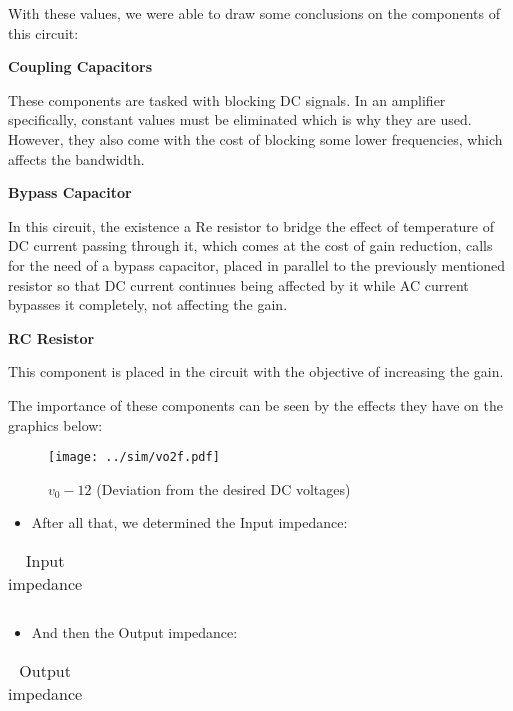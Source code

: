 \par With these values, we were able to draw some conclusions on the components of this circuit:
\par \textbf{Coupling Capacitors}
\par These components are tasked with blocking DC signals. In an amplifier specifically, constant values must be eliminated which is why they are used. However, they also come with the cost of blocking some lower frequencies, which affects the bandwidth.
\par \textbf{Bypass Capacitor}
\par In this circuit, the existence a Re resistor to bridge the effect of temperature of DC current passing through it, which comes at the cost of gain reduction, calls for the need of a bypass capacitor, placed in parallel to the previously mentioned resistor so that DC current continues being affected by it while AC current bypasses it completely, not affecting the gain.
\par \textbf{RC Resistor}
\par This component is placed in the circuit with the objective of increasing the gain. 
\par The importance of these components can be seen by the effects they have on the graphics below:

\begin{figure}[H]
    \texttt{[image: ../sim/vo2f.pdf]}
    \centering
    \caption{$v_0-12$ (Deviation from the desired DC voltages)}
    \label{mag}
\end{figure}

\begin{itemize}
	\item After all that, we determined the Input impedance:
\end{itemize}

\begin{table}[H]
  \centering
  \begin{tabular}{|c|c|}
    \hline    
    
  \end{tabular}
  \caption{Input impedance}
  \label{sim1}
\end{table}

\begin{itemize}
	\item And then the Output impedance:
\end{itemize}

\begin{table}[H]
  \centering
  \begin{tabular}{|c|c|}
    \hline    
    
  \end{tabular}
  \caption{Output impedance}
  \label{sim1}
\end{table}


